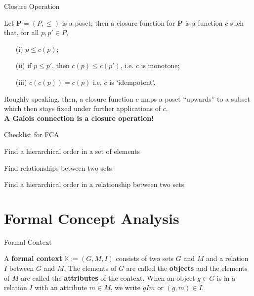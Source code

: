 \documentclass[pdf,xcolor=table]{beamer}
\newcommand{\cmark}{\ding{51}}%
\newcommand{\done}{\rlap{$\square$}{\raisebox{2pt}{\large\hspace{1pt}\cmark}}%
\hspace{-2.5pt}}
\begin{document}
\begin{frame}[t]{Closure Operation}
    \begin{definition}
        Let $\textbf{P} = (P, \leq)$ is a poset; then a closure function for \textbf{P} is a function $c$ such that, for all $p, p' \in P$,
        \begin{itemize}
            \item[(i)] $p \leq c(p)$;
            \item[(ii)] if $p \leq p'$, then $c(p) \leq c(p')$, i.e. $c$ is monotone;
            \item[(iii)] $c(c(p)) = c(p)$ i.e. $c$ is `idempotent'.
        \end{itemize}
    \end{definition}
    Roughly speaking, then, a closure function $c$ maps a poset ``upwards'' to a subset which then stays fixed under further applications of $c$. \\
    \textbf{A Galois connection is a closure operation!}
\end{frame}

\begin{frame}[t]{Checklist for FCA}
    \begin{todolist}
        \item[\done] Find a hierarchical order in a set of elements
        \item[\done] Find relationships between two sets
        \item Find a hierarchical order in a relationship between two sets
    \end{todolist}
\end{frame}

\section[Formal Concept Analysis]{Formal Concept Analysis}
\begin{frame}[t]{Formal Context}
    \begin{definition}
        A \textbf{formal context} $\mathbb{K} := (G, M, I)$ consists of two sets $G$ and $M$ and a relation $I$ between $G$ and $M$.
        The elements of $G$ are called the \textbf{objects} and the elements of $M$ are called the \textbf{attributes} of the context.
        When an object $g \in G$ is in a relation $I$ with an attribute $m \in M$, we write $gIm$ or $(g, m) \in I$.
    \end{definition}
\end{frame}
\end{document}
